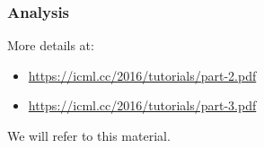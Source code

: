 \documentclass[usepdftitle=false, aspectratio=169]{beamer}
\begin{document}

	

\begin{frame}
	\frametitle{Analysis}
	
	More details at:
	\begin{itemize}
		\item 
		\url{https://icml.cc/2016/tutorials/part-2.pdf}
		\item 
		\url{https://icml.cc/2016/tutorials/part-3.pdf}
	\end{itemize}
	
	We will refer to this material.
	
\end{frame}
\end{document}
